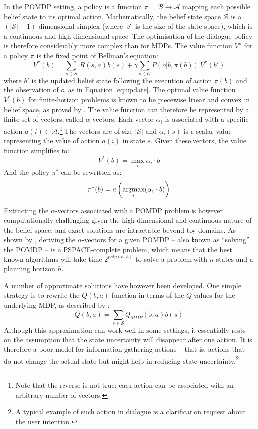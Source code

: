 In the POMDP setting, a policy is a function $\pi = \mathcal{B} \rightarrow \mathcal{A}$ mapping each possible belief state to its optimal action.  Mathematically, the belief state space $\mathcal{B}$ is a $(|\mathcal{S}|\!-\!1)$-dimensional simplex (where $|\mathcal{S}|$ is the size of the state space), which is a continuous and high-dimensional space. The optimisation of the dialogue policy is therefore considerably more complex than for MDPs. The value function $V^{\pi}$ for a policy $\pi$ is the fixed point of Bellman's equation: 
\begin{equation}
V^{\pi}(b) = \sum_{s \in S} \ R(s,a) b(s) + \gamma \sum_{o \in \mathcal{O}} P(o|b,\pi(b)) \ V^{\pi}(b')
\end{equation}
where $b'$ is the updated belief state following the execution of action $\pi(b)$ and the observation of $o$, as in Equation \eqref{eq:update}.  The optimal value function $V^*(b)$ for finite-horizon problems is known to be piecewise linear and convex in belief space, as proved by \cite{Sondik1971}. The value function can therefore be represented by a finite set of vectors, called $\alpha$-vectors. Each vector $\alpha_i$ is associated with a specific action $a(i) \in \mathcal{A}$.\footnote{Note that the reverse is not true: each action can be associated with an arbitrary number of vectors.}  The vectors are of size $|\mathcal{S}|$ and $\alpha_i(s)$ is a scalar value representing the value of action $a(i)$ in state $s$.  Given these vectors, the value function simplifies to:
\begin{equation}
V^*(b) = \max_{i} \alpha_i \cdot b
\end{equation}
And the policy $\pi^*$ can be rewritten as:
\begin{equation}
\pi^*(b) = a\left(\argmax_i(\alpha_i \cdot b)\right)
\end{equation}

Extracting the $\alpha$-vectors associated with a POMDP problem is however computationally challenging given the high-dimensional and continuous nature of the belief space, and exact solutions are intractable beyond toy domains. As shown by \cite{Papadimitriou:1987}, deriving the $\alpha$-vectors for a given POMDP -- also known as ``solving'' the POMDP -- is a PSPACE-complete problem, which means that the best known algorithms will take time $2^{poly(n,h)}$ to solve a problem with $n$ states and a planning horizon $h$.

A number of approximate solutions have however been developed.  One simple strategy is to rewrite the $Q(b,a)$ function in terms of the $Q$-values for the underlying MDP, as described by \cite{Littman:1997}:
\begin{equation}
Q(b,a) = \sum_{s \in \mathcal{S}} Q_{MDP} (s,a) b(s)
\end{equation}
Although this approximation can work well in some settings, it essentially rests on the assumption that the state uncertainty will disappear after one action.  It is therefore a poor model for information-gathering actions -- that is, actions that do not change the actual state but might help in reducing state uncertainty.\footnote{A typical example of such action in dialogue is a clarification request about the user intention.} 

